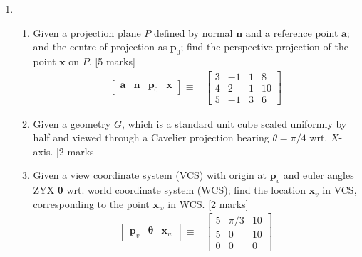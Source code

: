 \documentclass[11pt,a4paper,onecolumn]{tiet-question-paper}
\begin{document}
\begin{enumerate}[resume]
\item
  \begin{enumerate}
  \item Given a projection plane $P$ defined by normal
    $\textbf{n}$ and a reference point $\textbf{a}$;
    and the centre of projection as $\mathbf{p}_0$;
    find the perspective projection of the point
    $\textbf{x}$ on $P$. \hfill [5 marks]
    \begin{align*}
      \begin{bmatrix}
        \mathbf{a}&\mathbf{n}&\mathbf{p}_0&\mathbf{x}
      \end{bmatrix}\equiv
      &
        \begin{bmatrix}
          3&-1&1&8\\4&2&1&10\\5&-1&3&6
        \end{bmatrix}
    \end{align*}
  \item Given a geometry $G$, which is a standard unit
    cube scaled uniformly by half and viewed through a
    Cavelier projection bearing $\theta=\pi/4$
    wrt. $X$-axis. \hfill [2 marks]
  \item Given a view coordinate system (VCS) with
    origin at $\textbf{p}_v$ and euler angles ZYX
    $\boldsymbol{\theta}$ wrt. world coordinate system
    (WCS); find the location $\mathbf{x}_v$ in VCS,
    corresponding to the point $\textbf{x}_w$ in
    WCS. \hfill [2 marks]
    \begin{align*}
      \begin{bmatrix}
        \mathbf{p}_v & \boldsymbol{\theta} & \mathbf{x}_w
      \end{bmatrix}\equiv
      &\begin{bmatrix}
        5&\pi/3&10\\5&0&10\\0&0&0
      \end{bmatrix}
    \end{align*}
  \end{enumerate}
\end{enumerate}
\bvrhrule[0.4pt]
\end{document}
